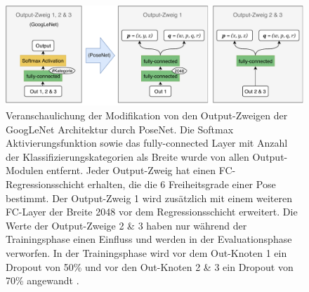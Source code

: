  \begin{figure}[bp]
	\centering
	\includegraphics[width=\textwidth]{images/googlenet/posenet_diagram2.pdf}
	\caption{Veranschaulichung der Modifikation von den Output-Zweigen der GoogLeNet Architektur durch PoseNet. Die Softmax Aktivierungsfunktion sowie das fully-connected Layer mit Anzahl der Klassifizierungskategorien als Breite wurde von allen Output-Modulen entfernt. Jeder Output-Zweig hat einen FC-Regressionsschicht erhalten, die die 6 Freiheitsgrade einer Pose bestimmt. Der Output-Zweig 1 wird zusätzlich mit einem weiteren FC-Layer der Breite 2048 vor dem Regressionsschicht erweitert. Die Werte der Output-Zweige 2 \& 3 haben nur während der Trainingsphase einen Einfluss und werden in der Evaluationsphase verworfen. In der Trainingsphase wird vor dem Out-Knoten 1 ein Dropout von 50\% und vor den Out-Knoten 2 \& 3 ein Dropout von 70\% angewandt \cite{kendallPoseNetConvolutionalNetwork2015}.}
	\label{fig:posenet_mods}
\end{figure}